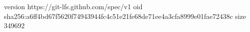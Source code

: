version https://git-lfs.github.com/spec/v1
oid sha256:a6ff4bd67f5620f74943944fc4c51e21fe68de71ee4a3cfa8999e01fae72438c
size 349692
